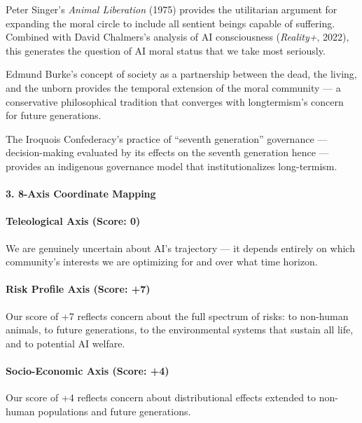 Peter Singer's \emph{Animal Liberation} (1975) provides the utilitarian
argument for expanding the moral circle to include all sentient beings
capable of suffering. Combined with David Chalmers's analysis of AI
consciousness (\emph{Reality+}, 2022), this generates the question of AI
moral status that we take most seriously.

Edmund Burke's concept of society as a partnership between the dead, the
living, and the unborn provides the temporal extension of the moral
community --- a conservative philosophical tradition that converges with
longtermism's concern for future generations.

The Iroquois Confederacy's practice of ``seventh generation'' governance
--- decision-making evaluated by its effects on the seventh generation
hence --- provides an indigenous governance model that institutionalizes
long-termism.

\paragraph{3. 8-Axis Coordinate
Mapping}\label{axis-coordinate-mapping-36}

\paragraph{Teleological Axis (Score:
0)}\label{teleological-axis-score-0-3}

We are genuinely uncertain about AI's trajectory --- it depends entirely
on which community's interests we are optimizing for and over what time
horizon.

\paragraph{Risk Profile Axis (Score:
+7)}\label{risk-profile-axis-score-7-4}

Our score of +7 reflects concern about the full spectrum of risks: to
non-human animals, to future generations, to the environmental systems
that sustain all life, and to potential AI welfare.

\paragraph{Socio-Economic Axis (Score:
+4)}\label{socio-economic-axis-score-4-4}

Our score of +4 reflects concern about distributional effects extended
to non-human populations and future generations.


